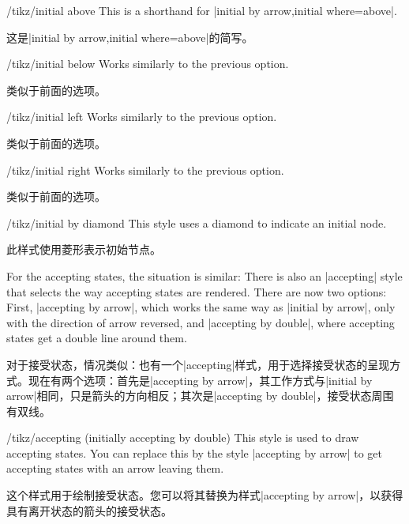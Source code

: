 \begin{stylekey}{/tikz/initial above}
    This is a shorthand for |initial by arrow,initial where=above|.

    这是|initial by arrow,initial where=above|的简写。

\end{stylekey}

\begin{stylekey}{/tikz/initial below}
    Works similarly to the previous option.

    类似于前面的选项。
\end{stylekey}

\begin{stylekey}{/tikz/initial left}
    Works similarly to the previous option.

    类似于前面的选项。
\end{stylekey}

\begin{stylekey}{/tikz/initial right}
    Works similarly to the previous option.

    类似于前面的选项。

\end{stylekey}

\begin{stylekey}{/tikz/initial by diamond}
    This style uses a diamond to indicate an initial node.

    此样式使用菱形表示初始节点。


\end{stylekey}

For the accepting states, the situation is similar: There is also an
|accepting| style that selects the way accepting states are rendered. There are
now two options: First, |accepting by arrow|, which works the same way as
|initial by arrow|, only with the direction of arrow reversed, and
|accepting by double|, where accepting states get a double line around them.

对于接受状态，情况类似：也有一个|accepting|样式，用于选择接受状态的呈现方式。现在有两个选项：首先是|accepting by arrow|，其工作方式与|initial by arrow|相同，只是箭头的方向相反；其次是|accepting by double|，接受状态周围有双线。

\begin{stylekey}{/tikz/accepting (initially accepting by double)}
    This style is used to draw accepting states.  You can replace this by the
    style |accepting by arrow| to get accepting states with an arrow leaving
    them.

    这个样式用于绘制接受状态。您可以将其替换为样式|accepting by arrow|，以获得具有离开状态的箭头的接受状态。
\end{stylekey}

